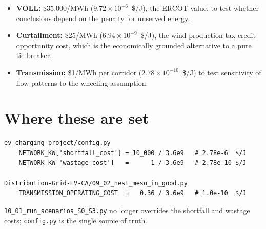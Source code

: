 \documentclass[11pt,a4paper]{article}
\begin{document}
\begin{itemize}[leftmargin=*]
  \item \textbf{VOLL:} \$35{,}000/MWh ($9.72\times10^{-6}$~\$/J), the ERCOT
        value, to test whether conclusions depend on the penalty for unserved
        energy.
  \item \textbf{Curtailment:} \$25/MWh ($6.94\times10^{-9}$~\$/J), the wind
        production tax credit opportunity cost, which is the economically
        grounded alternative to a pure tie-breaker.
  \item \textbf{Transmission:} \$1/MWh per corridor
        ($2.78\times10^{-10}$~\$/J) to test sensitivity of flow patterns to the
        wheeling assumption.
\end{itemize}

\section{Where these are set}

\begin{lstlisting}
ev_charging_project/config.py
    NETWORK_KW['shortfall_cost'] = 10_000 / 3.6e9   # 2.78e-6  $/J
    NETWORK_KW['wastage_cost']   =      1 / 3.6e9   # 2.78e-10 $/J

Distribution-Grid-EV-CA/09_02_nest_meso_in_good.py
    TRANSMISSION_OPERATING_COST  =   0.36 / 3.6e9   # 1.0e-10  $/J
\end{lstlisting}

\texttt{10\_01\_run\_scenarios\_S0\_S3.py} no longer overrides the shortfall and
wastage costs; \texttt{config.py} is the single source of truth.
\end{document}
